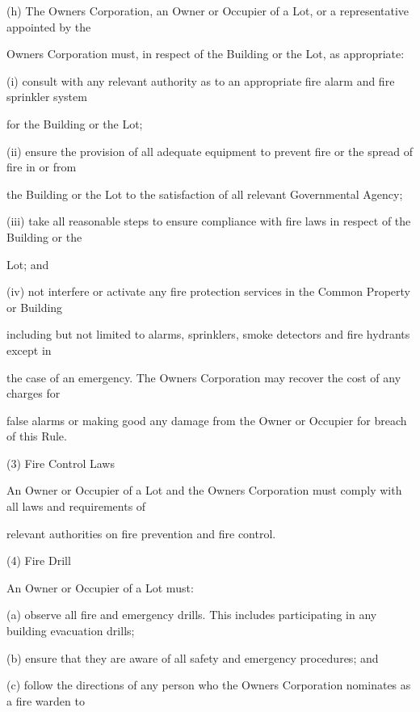 \documentclass{article}
\begin{document}
{\fontsize{9.962}{1}(h) The Owners Corporation, an Owner or Occupier of a Lot, or a representative appointed by the }

{\fontsize{10.02}{1}Owners Corporation must, in respect of the Building or the Lot, as appropriate: }

{\fontsize{9.962}{1}(i) consult with any relevant authority as to an appropriate fire alarm and fire sprinkler system }

{\fontsize{10.02}{1}for the Building or the Lot; }

{\fontsize{9.962}{1}(ii) ensure the provision of all adequate equipment to prevent fire or the spread of fire in or from }

{\fontsize{10.02}{1}the Building or the Lot to the satisfaction of all relevant Governmental Agency; }

{\fontsize{9.962}{1}(iii) take all reasonable steps to ensure compliance with fire laws in respect of the Building or the }

{\fontsize{10.02}{1}Lot; and }

{\fontsize{9.962}{1}(iv) not interfere or activate any fire protection services in the Common Property or Building }

{\fontsize{10.02}{1}including but not limited to alarms, sprinklers, smoke detectors and fire hydrants except in }

{\fontsize{10.02}{1}the case of an emergency. The Owners Corporation may recover the cost of any charges for }

{\fontsize{10.02}{1}false alarms or making good any damage from the Owner or Occupier for breach of this Rule. }

{\fontsize{9.962}{1}(3) Fire Control Laws }

{\fontsize{10.02}{1}An Owner or Occupier of a Lot and the Owners Corporation must comply with all laws and requirements of }

{\fontsize{10.02}{1}relevant authorities on fire prevention and fire control. }

{\fontsize{9.962}{1}(4) Fire Drill }

{\fontsize{10.02}{1}An Owner or Occupier of a Lot must: }

{\fontsize{9.962}{1}(a) observe all fire and emergency drills. This includes participating in any building evacuation drills; }

{\fontsize{9.962}{1}(b) ensure that they are aware of all safety and emergency procedures; and }

{\fontsize{9.962}{1}(c) follow the directions of any person who the Owners Corporation nominates as a fire warden to }
\end{document}
